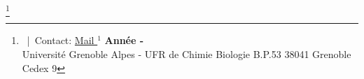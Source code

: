 \documentclass[../Master_report2.tex]{subfiles}
\begin{document}
\begin{titlepage}
\noindent
\begin{minipage}{1.8in}

\end{minipage}
\hfill
\begin{minipage}{3.55in}
\makeatletter
\@labadr
\makeatother
\end{minipage}

\begin{figure}[h]
\begin{center}
\makeatletter
\@pict
\makeatother
\end{center}
\end{figure}
\thispagestyle{empty}


\renewcommand{\footnoterule}{%
  \kern -3pt
  \hrule width \textwidth height 1pt
  \kern 2pt
}


\let\thefootnote\relax\makeatletter\footnote{{%
\@credpict
~|~Contact:  \href{mailto:\@email%
}{Mail $^1$}} 
\hfill \textbf{Année \the\year-\the\year}\\
Université Grenoble Alpes - UFR de Chimie Biologie B.P.53 38041 Grenoble Cedex 9}
\makeatother


\end{titlepage}

\newpage
\nocite{RTeam2017}
\biblio
\end{document}
